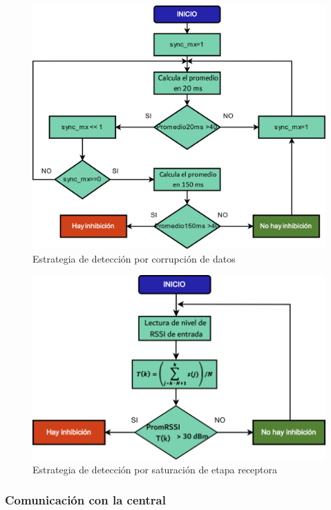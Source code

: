 \begin{figure}
	\centering
	\includegraphics[scale=0.43]{images/nodos/estrategia_datos.png}
    \caption{Estrategia de detección por corrupción de datos}
	\label{estrategia_datos}
\end{figure}

\begin{figure}
	\centering
	\includegraphics[scale=0.43]{images/nodos/estrategia_rssi.png}
    \caption{Estrategia de detección por saturación de etapa receptora}
	\label{estrategia_rssi}
\end{figure}

\subsubsection{Comunicación con la central}

